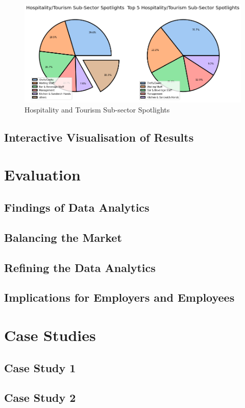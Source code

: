 \documentclass[twoside, 12pt, a4paper]{article}
\begin{document}
\begin{figure}[h]
	\centering
	\includegraphics[scale = 0.50]{Hopsspotlight.png}
	\caption{Hospitality and Tourism Sub-sector Spotlights}
	\label{fig:Hospspotlight}
\end{figure}



\newpage
\subsection{Interactive Visualisation of Results}

\newpage
\section{Evaluation}
\subsection{Findings of Data Analytics}
\subsection{Balancing the Market}
\subsection{Refining the Data Analytics}
\subsection{Implications for Employers and Employees}

\newpage
\section{Case Studies}
\subsection{Case Study 1}
\subsection{Case Study 2}
\end{document}

